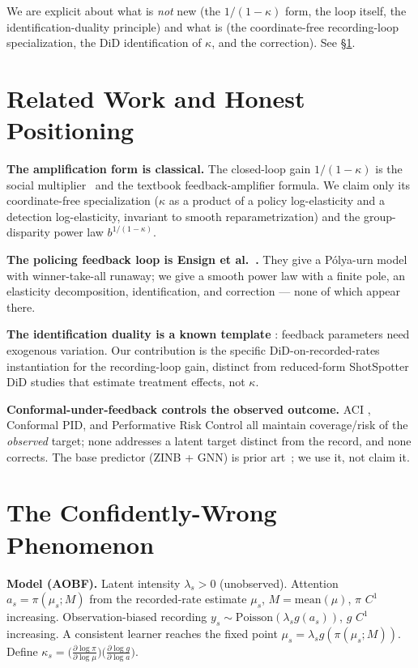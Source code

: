 \documentclass[10pt]{article}
\begin{document}
We are explicit about what is \emph{not} new (the $1/(1-\kappa)$ form, the loop
itself, the identification-duality principle) and what is (the coordinate-free
recording-loop specialization, the DiD identification of $\kappa$, and the
correction). See \S\ref{sec:related}.

\section{Related Work and Honest Positioning}
\label{sec:related}

\textbf{The amplification form is classical.} The closed-loop gain $1/(1-\kappa)$
is the social multiplier~\cite{glaeser2003} and the textbook feedback-amplifier
formula. We claim only its coordinate-free specialization ($\kappa$ as a product
of a policy log-elasticity and a detection log-elasticity, invariant to smooth
reparametrization) and the group-disparity power law
$b^{1/(1-\kappa)}$.

\textbf{The policing feedback loop is Ensign et al.~\cite{ensign2018}.} They give
a P\'olya-urn model with winner-take-all runaway; we give a smooth power law with
a finite pole, an elasticity decomposition, identification, and correction ---
none of which appear there.

\textbf{The identification duality is a known template}
\cite{mendlerduenner2022}: feedback parameters need exogenous variation. Our
contribution is the specific DiD-on-recorded-rates instantiation for the
recording-loop gain, distinct from reduced-form ShotSpotter DiD studies that
estimate treatment effects, not $\kappa$.

\textbf{Conformal-under-feedback controls the observed outcome.} ACI
\cite{gibbs2021}, Conformal PID, and Performative Risk Control all maintain
coverage/risk of the \emph{observed} target; none addresses a latent target
distinct from the record, and none corrects. The base predictor (ZINB + GNN) is
prior art~\cite{zhuang2022,wang2024}; we use it, not claim it.

\section{The Confidently-Wrong Phenomenon}
\label{sec:law}

\textbf{Model (AOBF).} Latent intensity $\lambda_s>0$ (unobserved). Attention
$a_s=\pi(\mu_s;M)$ from the recorded-rate estimate $\mu_s$, $M=\text{mean}(\mu)$,
$\pi$ $C^1$ increasing. Observation-biased recording
$y_s\sim\text{Poisson}(\lambda_s g(a_s))$, $g$ $C^1$ increasing. A consistent
learner reaches the fixed point $\mu_s=\lambda_s g(\pi(\mu_s;M))$. Define
$\kappa_s=\big(\tfrac{\partial\log\pi}{\partial\log\mu}\big)\big(\tfrac{\partial\log g}{\partial\log a}\big)$.
\end{document}
